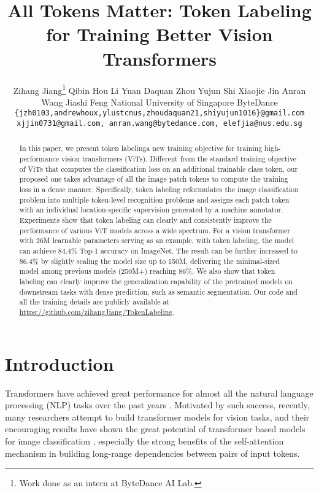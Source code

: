 \documentclass{article}
\title{All Tokens Matter: Token Labeling for Training Better Vision Transformers}
\author{Zihang Jiang\thanks{Work done as an intern at ByteDance AI Lab.} \And Qibin Hou \And Li Yuan \And Daquan Zhou \And Yujun Shi  \AND Xiaojie Jin \And Anran Wang \And Jiashi Feng \AND
National University of Singapore  \And  ByteDance \And
{\tt\small \{jzh0103,andrewhoux,ylustcnus,zhoudaquan21,shiyujun1016\}@gmail.com} \\
{\tt\small xjjin0731@gmail.com, anran.wang@bytedance.com, elefjia@nus.edu.sg}
}
\begin{document}
\maketitle

\begin{abstract}
In this paper, we present token labeling\textemdash a new training objective 
for training high-performance vision transformers (ViTs).
Different from the standard training objective of ViTs that computes the classification loss on an additional trainable class token,  
our proposed one takes advantage of all the image patch tokens to compute the training loss in a dense manner.
Specifically, token labeling reformulates the image classification problem into multiple token-level recognition problems and 
assigns each patch token with an individual location-specific supervision  generated by a machine annotator.
Experiments show that token labeling can clearly and consistently improve the performance of various ViT models across a wide spectrum.
For a vision transformer with 26M learnable parameters serving as an example, with token labeling, the model can achieve 84.4\% Top-1 accuracy on ImageNet.
The result can be further increased to 86.4\% by slightly scaling the model size up to 150M, delivering the minimal-sized model among previous models (250M+) reaching 86\%.
We also show that token labeling can clearly improve the generalization capability of the pretrained models  on downstream tasks with dense prediction, such as semantic segmentation.
Our code and all the training details are publicly available at \url{https://github.com/zihangJiang/TokenLabeling}.

\end{abstract}

\section{Introduction} \label{sec:introduction}

Transformers \cite{vaswani2017attention} have achieved great performance for almost all the natural language processing (NLP) tasks over the past years \cite{brown2020language,devlin2018bert,liu2019roberta}.
Motivated by such success, recently, many researchers attempt to build transformer models for vision tasks, and their encouraging results have shown the great potential of transformer based models for image classification \cite{chen2021crossvit,dosovitskiy2020image,liu2021swin,touvron2020training,wang2021pyramid,yuan2021tokens}, 
especially the strong benefits of the self-attention mechanism in building long-range dependencies between pairs of input tokens.
\end{document}
